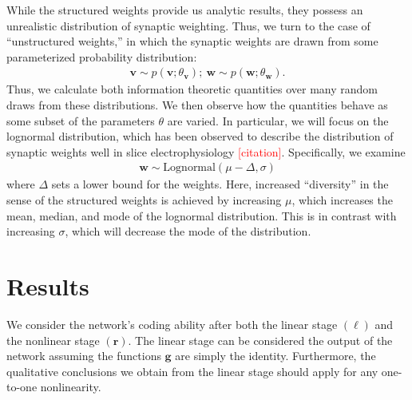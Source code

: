 \documentclass[11pt]{article}
\begin{document}
	While the structured weights provide us analytic results, they possess an unrealistic distribution of synaptic weighting. Thus, we turn to the case of ``unstructured weights,'' in which the synaptic weights are drawn from some parameterized probability distribution:
	\begin{align}
		\mathbf{v} \sim p(\mathbf{v}; \theta_{\mathbf{v}}); \ \mathbf{w} \sim p(\mathbf{w}; \theta_{\mathbf{w}}).
	\end{align}
	Thus, we  calculate both information theoretic quantities over many random draws from these distributions. We then observe how the quantities behave as some subset of the parameters $\theta$ are varied. In particular, we will focus on the lognormal distribution, which has been observed to describe the distribution of synaptic weights well in slice electrophysiology \textcolor{red}{[citation]}. Specifically, we examine 
	\begin{align}
		\mathbf{w}\sim \text{Lognormal}(\mu - \Delta, \sigma)
	\end{align}
	where $\Delta$ sets a lower bound for the weights. Here, increased ``diversity'' in the sense of the structured weights is achieved by increasing $\mu$, which increases the mean, median, and mode of the lognormal distribution. This is in contrast with increasing $\sigma$, which will decrease the mode of the distribution.
	
\section{Results}
We consider the network's coding ability after both the linear stage $(\boldsymbol{\ell})$ and the nonlinear stage $(\mathbf{r})$. The linear stage can be considered the output of the network assuming the functions $\mathbf{g}$ are simply the identity. Furthermore, the qualitative conclusions we obtain from the linear stage should apply for any one-to-one nonlinearity. 
\end{document}
